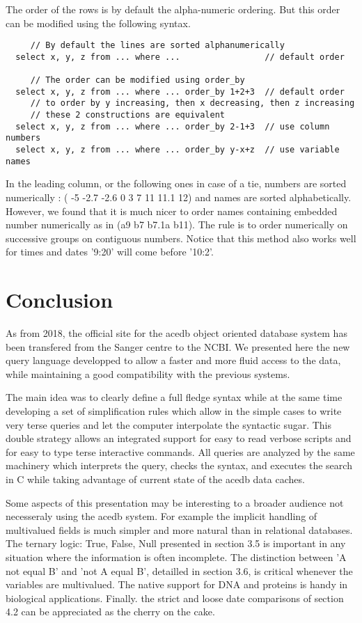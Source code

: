 \documentclass[11pt]{article}
\newcommand{\BL}{\begin{lstlisting}}
\begin{document}
The order of the rows is by default the alpha-numeric ordering.
But this order can be modified using the following syntax.

\BL
     // By default the lines are sorted alphanumerically
  select x, y, z from ... where ...                 // default order

     // The order can be modified using order_by
  select x, y, z from ... where ... order_by 1+2+3  // default order
     // to order by y increasing, then x decreasing, then z increasing
     // these 2 constructions are equivalent
  select x, y, z from ... where ... order_by 2-1+3  // use column numbers
  select x, y, z from ... where ... order_by y-x+z  // use variable names
\end{lstlisting}
In the leading column, or the following ones in case of a tie,
numbers are sorted numerically : ( -5 -2.7 -2.6 0 3 7 11 11.1 12) 
and names are sorted alphabetically. However, we found\cite {[1]} that it is much nicer to
order names containing embedded number numerically as in (a9 b7 b7.1a b11). 
The rule is to order numerically on successive groups on contiguous numbers.
Notice that this method also works well for times and dates
'9:20' will come before '10:2'.

\section{Conclusion}

As from 2018, the official site for the acedb object oriented database system 
has been transfered from the Sanger centre to the NCBI.
We presented here the new
query language developped to allow 
a faster and more fluid access to the data,
while maintaining a good compatibility with the previous systems.

The main idea was to clearly define a full fledge syntax
while at the same time developing a set of simplification rules
which allow in the simple cases to write very terse queries
and let the computer interpolate the syntactic sugar.
This double strategy allows an integrated support
for easy to read verbose scripts and for
easy to type terse interactive commands. All queries
are analyzed by the same machinery which interprets the query,
checks the syntax, and executes the search in C
while taking advantage of current state of the acedb data caches.
 
Some aspects of this presentation may be interesting to a broader audience 
not necesseraly using the acedb system. For example the implicit handling of multivalued
fields is much simpler and more natural than in relational databases.
The ternary logic: True, False, Null presented 
in section 3.5 is important in any situation where the information is often incomplete. The distinction between
'A not equal B' and 'not A equal B', detailled in section 3.6, is critical whenever the variables are multivalued.
The native support for DNA and proteins is handy in biological applications. 
Finally. the strict and loose date comparisons of section 4.2 can be appreciated as the cherry on the cake.
\end{document}

